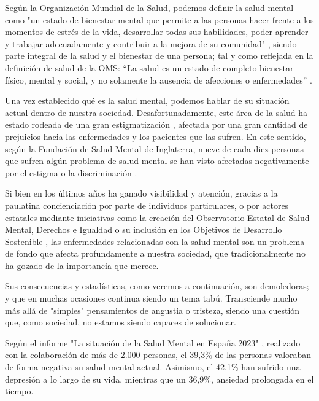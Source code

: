 Según la Organización Mundial de la Salud, podemos definir la salud mental como "un estado de bienestar mental que permite a las personas hacer frente a los momentos de estrés de la vida, desarrollar todas sus habilidades, poder aprender y trabajar adecuadamente y contribuir a la mejora de su comunidad" \cite{oms_salud_2022}, siendo parte integral de la salud y el bienestar de una persona; tal y como reflejada en la definición de salud de la OMS: “La salud es un estado de completo bienestar físico, mental y social, y no solamente la ausencia de afecciones o enfermedades” \cite{feafes_galicia_que_nodate}. 

Una vez establecido qué es la salud mental, podemos hablar de su situación actual dentro de nuestra sociedad. Desafortunadamente, este área de la salud ha estado rodeada de una gran estigmatización \cite{delgado_rompiendo_2021}  \cite{andres_tallarda_combatir_2020}, afectada por una gran cantidad de prejuicios hacia las enfermedades y los pacientes que las sufren. En este sentido, según la Fundación de Salud Mental de Inglaterra, nueve de cada diez personas que sufren algún problema de salud mental se han visto afectadas negativamente por el estigma o la discriminación \cite{mental_health_foundation_stigma_nodate}.

Si bien en los últimos años ha ganado visibilidad y atención, gracias a la paulatina concienciación por parte de individuos particulares, o por actores estatales mediante iniciativas como la creación del 
Observatorio Estatal de Salud Mental, Derechos e Igualdad \cite{comunicacion_nace_2022} o su inclusión en los Objetivos de Desarrollo Sostenible \cite{oms_salud_nodate},  las enfermedades relacionadas con la salud mental son un problema de fondo que afecta profundamente a nuestra sociedad, que tradicionalmente no ha gozado de la importancia que merece.

Sus consecuencias y estadísticas, como veremos a continuación, son demoledoras; y que en muchas ocasiones continua siendo un tema tabú. Transciende mucho más allá de "simples" pensamientos de angustia o tristeza, siendo una cuestión que, como sociedad, no estamos siendo capaces de solucionar.

Según el informe "La situación de la Salud Mental en España 2023" \cite{comunicacion_cuatro_2023}, realizado con la colaboración de más de 2.000 personas, el 39,3\% de las personas valoraban de forma negativa su salud mental actual. Asimismo, el 42,1\% han sufrido una depresión a lo largo de su vida, mientras que un 36,9\%, ansiedad prolongada en el tiempo. 

